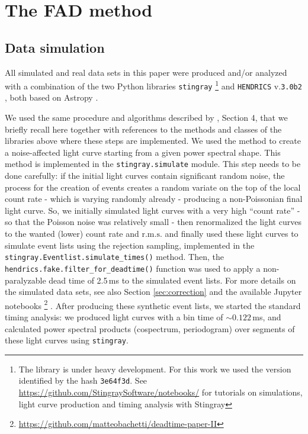 \documentclass[twocolumn]{aastex61}
\newcommand{\rms}{\ensuremath{\mathrm{r.m.s.}}\xspace}
\begin{document}
\section{The FAD method} \label{sec:fadsec}
\subsection{Data simulation} \label{sec:data}
All simulated and real data sets in this paper were produced and/or analyzed with a combination of the two Python libraries \texttt{stingray}%
\footnote{The library is under heavy development.
    For this work we used the version identified by the hash \texttt{3e64f3d}.
    See \href{https://github.com/StingraySoftware/notebooks/}{https://github.com/StingraySoftware/notebooks/} for tutorials on simulations, light curve production and timing analysis with Stingray}
\citep{huppenkothen2016} and \texttt{HENDRICS} v.\texttt{3.0b2} \citep[formerly known as MaLTPyNT;][]{2015ascl.soft02021B}, both based on Astropy \citep{astropy2013}.

We used the same procedure and algorithms described by \citet{Bachetti+15}, Section 4, that we briefly recall here together with references to the methods and classes of the libraries above where these steps are implemented.
We used the \citet{timmer1995} method to create a noise-affected light curve starting from a given power spectral shape. 
This method is implemented in the \texttt{stingray.simulate} module.
This step needs to be done carefully: if the initial light curves contain significant random noise, the process for the creation of events creates a random variate on the top of the local count rate - which is varying randomly already - producing a non-Poissonian final light curve. 
So, we initially simulated light curves with a very high ``count rate'' - so that the Poisson noise was relatively small - then renormalized the light curves to the wanted (lower) count rate and \rms and finally used these light curves to simulate event lists using the rejection sampling, implemented in the \texttt{stingray.Eventlist.simulate\_times()} method.
Then, the \texttt{hendrics.fake.filter\_for\_deadtime()} function was used to apply a non-paralyzable dead time of 2.5\,ms to the simulated event lists. For more details on the simulated data sets, see also Section \ref{sec:correction} and the available Jupyter notebooks%
\footnote{\href{https://github.com/matteobachetti/deadtime-paper-II}{https://github.com/matteobachetti/deadtime-paper-II}} \citep[for a description of Jupyter notebooks, see][]{kluyver2016jupyter}.
After producing these synthetic event lists, we started the standard timing analysis: we produced light curves with a bin time of $\sim0.122$\,ms, and calculated power spectral products (cospectrum, periodogram) over segments of these light curves using \texttt{stingray}.
\end{document}
